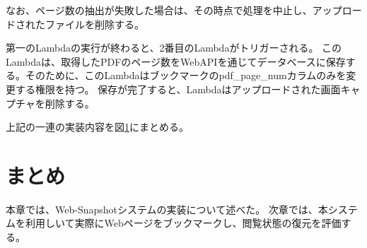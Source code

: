 なお、ページ数の抽出が失敗した場合は、その時点で処理を中止し、アップロードされたファイルを削除する。

第一のLambdaの実行が終わると、2番目のLambdaがトリガーされる。
このLambdaは、取得したPDFのページ数をWebAPIを通じてデータベースに保存する。そのために、このLambdaはブックマークのpdf\_page\_numカラムのみを変更する権限を持つ。
保存が完了すると、Lambdaはアップロードされた画面キャプチャを削除する。

上記の一連の実装内容を図\ref{}にまとめる。

\section{まとめ}
本章では、Web-Snapshotシステムの実装について述べた。
次章では、本システムを利用しいて実際にWebページをブックマークし、閲覧状態の復元を評価する。